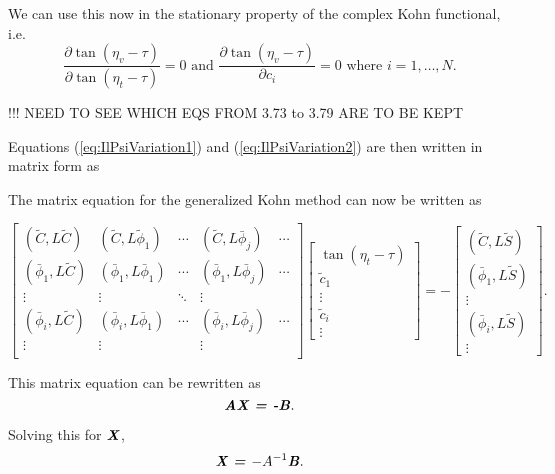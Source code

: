 \documentclass[preprint,showpacs,preprintnumbers,amsmath,amssymb]{revtex4}
\newcommand{\beq}{\begin{equation}}
\newcommand{\eeq}{\end{equation}}
\begin{document}


We can use this now in the stationary property of the complex Kohn functional, i.e.
\beq
\frac{\partial \tan(\eta_v- \tau)}{\partial \tan(\eta_t- \tau)} = 0  \text{ and } \frac{\partial\tan(\eta_v- \tau)}{\partial c_i} = 0 \text{ where $i = 1,\ldots,N$}.
\label{eq:GeneralKohnStationary}
\eeq

!!! NEED TO SEE WHICH EQS FROM 3.73 to 3.79 ARE TO BE KEPT


Equations (\ref{eq:IlPsiVariation1}) and (\ref{eq:IlPsiVariation2}) are then written in matrix form as

 The matrix equation for the generalized Kohn method can now be written as

\begin{equation}
\label{eq:GenKohnMatrix}
\begin{bmatrix} 
 (\tilde{C},L\tilde{C}) & (\tilde{C},L\tilde{\phi}_1) & \cdots & (\tilde{C},L\bar{\phi}_j) & \cdots\\
 (\bar{\phi}_1,L\tilde{C}) & (\bar{\phi}_1,L\bar{\phi}_1) & \cdots & (\bar{\phi}_1,L\bar{\phi}_j) & \cdots\\
 \vdots & \vdots & \ddots & \vdots \\
 (\bar{\phi}_i,L\tilde{C}) & (\bar{\phi}_i,L\bar{\phi}_1) & \cdots & (\bar{\phi}_i,L\bar{\phi}_j) & \cdots\\
 \vdots & \vdots & & \vdots & \\
\end{bmatrix}
\begin{bmatrix}
{\tan(\eta_t- \tau)}\\
\tilde{c}_1\\
\vdots\\
\tilde{c}_i\\
\vdots
\end{bmatrix}
= -
\begin{bmatrix}
(\tilde{C},L\tilde{S}) \\
(\bar{\phi}_1,L\tilde{S}) \\
\vdots \\
(\bar{\phi}_i,L\tilde{S}) \\
\vdots
\end{bmatrix}.
\end{equation}

\noindent This matrix equation can be rewritten as
\beq
\textbf{\emph{AX = -B}}.
\eeq

\noindent Solving this for $\textbf{\emph{X}}$,
\beq
\textbf{\emph{X = $-A^{-1}$B}}.
\eeq
\end{document}
